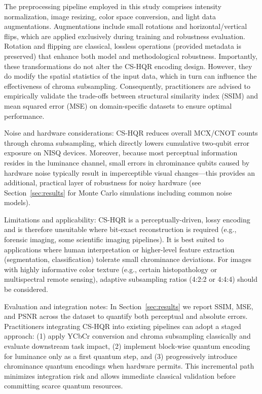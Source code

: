 \documentclass[11pt,a4paper]{article}
\begin{document}
The preprocessing pipeline employed in this study comprises intensity normalization, image resizing, color space conversion, and light data augmentations. Augmentations include small rotations and horizontal/vertical flips, which are applied exclusively during training and robustness evaluation. Rotation and flipping are classical, lossless operations (provided metadata is preserved) that enhance both model and methodological robustness. Importantly, these transformations do not alter the CS-HQR encoding design. However, they do modify the spatial statistics of the input data, which in turn can influence the effectiveness of chroma subsampling. Consequently, practitioners are advised to empirically validate the trade-offs between structural similarity index (SSIM) and mean squared error (MSE) on domain-specific datasets to ensure optimal performance.

Noise and hardware considerations: CS-HQR reduces overall MCX/CNOT counts through chroma subsampling, which directly lowers cumulative two-qubit error exposure on NISQ devices. Moreover, because most perceptual information resides in the luminance channel, small errors in chrominance qubits caused by hardware noise typically result in imperceptible visual changes—this provides an additional, practical layer of robustness for noisy hardware (see Section~\ref{sec:results} for Monte Carlo simulations including common noise models).

Limitations and applicability: CS-HQR is a perceptually-driven, lossy encoding and is therefore unsuitable where bit-exact reconstruction is required (e.g., forensic imaging, some scientific imaging pipelines). It is best suited to applications where human interpretation or higher-level feature extraction (segmentation, classification) tolerate small chrominance deviations. For images with highly informative color texture (e.g., certain histopathology or multispectral remote sensing), adaptive subsampling ratios (4:2:2 or 4:4:4) should be considered.

Evaluation and integration notes: In Section~\ref{sec:results} we report SSIM, MSE, and PSNR across the dataset to quantify both perceptual and absolute errors. Practitioners integrating CS-HQR into existing pipelines can adopt a staged approach: (1) apply YCbCr conversion and chroma subsampling classically and evaluate downstream task impact, (2) implement block-wise quantum encoding for luminance only as a first quantum step, and (3) progressively introduce chrominance quantum encodings when hardware permits. This incremental path minimizes integration risk and allows immediate classical validation before committing scarce quantum resources.
\end{document}
